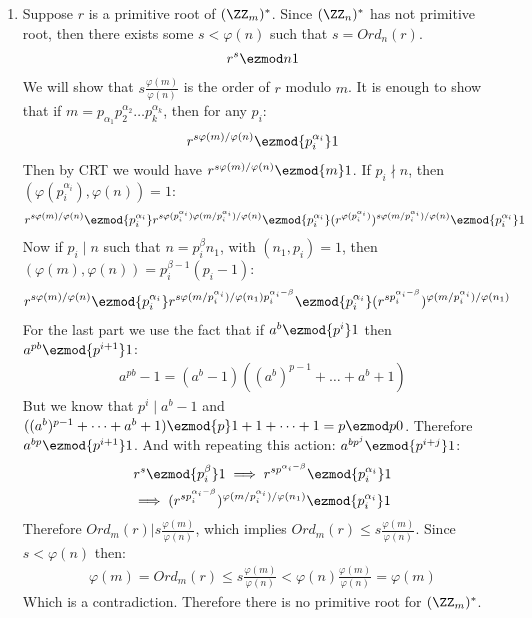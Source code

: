 \begin{enumerate}[label=]
    \item 
        Suppose $r$ is a primitive root of $(\ZZ_m)^*$. Since $(\ZZ_n)^*$ has not primitive root, then there exists some $s < \varphi(n)$ such that $s = Ord_n(r)$.
        \begin{gather*}
            r^s \ezmod n 1
        \end{gather*}
        We will show that $s \frac{\varphi(m)}{\varphi(n)}$ is the order of $r$ modulo $m$.
        It is enough to show that if $m = p_{\alpha_1} p_2^{\alpha_2} \dots p_k^{\alpha_k}$, then for any $p_i$:
        \begin{gather*}
            r^{s \varphi(m) / \varphi(n)} \ezmod{p_i^{\alpha_i}} 1
        \end{gather*}
        Then by CRT we would have $r^{s \varphi(m) / \varphi(n)} \ezmod{m} 1$. If $p_i \nmid n$, then $(\varphi(p_i^{\alpha_i}), \varphi(n)) = 1$:
        \begin{gather*}
            r^{s \varphi(m) / \varphi(n)} \ezmod{p_i^{\alpha_i}} r^{s \varphi(p_i^{\alpha_i}) \varphi(m/p_i^{\alpha_i}) / \varphi(n)} \ezmod{p_i^{\alpha_i}} (r^{\varphi(p_i^{\alpha_i})})^{s \varphi(m/p_i^{\alpha_i}) /\varphi(n)} \ezmod{p_i^{\alpha_i}} 1
        \end{gather*}
        Now if $p_i \mid n$ such that $n = p_i^\beta n_1$, with $(n_1, p_i) = 1$, then $(\varphi(m), \varphi(n)) = p_i^{\beta - 1} (p_i - 1)$:
        \begin{gather*}
            r^{s \varphi(m) / \varphi(n)} \ezmod{p_i^{\alpha_i}} r^{s \varphi(m/p_i^{\alpha_i}) / \varphi(n_1) p_i^{\alpha_i - \beta}} \ezmod{p_i^{\alpha_i}} (r^{s p_i^{\alpha_i - \beta}})^{\varphi(m / p_i^{\alpha_i}) / \varphi(n_1)}
        \end{gather*}
        For the last part we use the fact that if $a^b \ezmod{p^i} 1$ then $a^{pb} \ezmod{p^{i + 1}} 1$:
        \begin{gather*}
            a^{pb} - 1 = (a^b - 1) ((a^b)^{p - 1} + \dots + a^b + 1)
        \end{gather*}
        But we know that $p^i \mid a^b - 1$ and $((a^b)^{p - 1} + \dots + a^b + 1) \ezmod{p} 1 + 1 + \dots + 1 = p \ezmod p 0$. 
        Therefore $a^{bp} \ezmod{p^{i + 1}} 1$. And with repeating this action: $a^{bp^j} \ezmod{p^{i + j}} 1$:
        \begin{gather*}
            r^s \ezmod{p_i^\beta} 1 \implies r^{s p^{\alpha_i - \beta}} \ezmod{p_i^{\alpha_i}} 1 \\
            \implies (r^{s p_i^{\alpha_i - \beta}})^{\varphi(m / p_i^{\alpha_i}) / \varphi(n_1)} \ezmod{p_i^{\alpha_i}} 1
        \end{gather*}
        Therefore $Ord_m(r) | s \frac{\varphi(m)}{\varphi(n)}$, which implies $Ord_m(r) \le s \frac{\varphi(m)}{\varphi(n)}$. Since $s < \varphi(n)$ then:
        \begin{gather*}
            \varphi(m) = Ord_m(r) \le s \frac{\varphi(m)}{\varphi(n)} < \varphi(n) \frac{\varphi(m)}{\varphi(n)} = \varphi(m)
        \end{gather*}
        Which is a contradiction. Therefore there is no primitive root for $(\ZZ_m)^*$.
\end{enumerate}